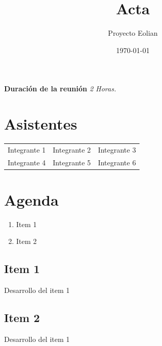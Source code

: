 \documentclass[letterpaper]{article}
\title{Acta}
\author{Proyecto Eolian}
\date{\today}
\begin{document}
\maketitle
\thispagestyle{fancy}

\textbf{Duración de la reunión} \qquad \textit{2 Horas.}

\section{Asistentes}
\begin{table}[H]
\begin{tabular}{lll}
Integrante 1 & Integrante 2 & Integrante 3 \\
Integrante 4 & Integrante 5 & Integrante 6 
\end{tabular}
\end{table}

\section{Agenda}
	\begin{enumerate}
		\item Item 1
        \item Item 2
	\end{enumerate}

\subsection{Item 1}

Desarrollo del item 1


\subsection{Item 2}

Desarrollo del item 1
\end{document}
